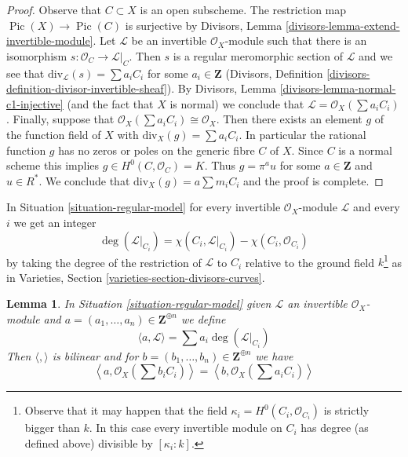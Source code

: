 \documentclass{stacks-project}
\theoremstyle{plain}
\newtheorem{lemma}[subsection]{Lemma}
\theoremstyle{definition}
\theoremstyle{remark}
\numberwithin{equation}{subsection}
\def\Pic{\mathop{\mathrm{Pic}}\nolimits}
\begin{document}
\begin{proof}
Observe that $C \subset X$ is an open subscheme. The restriction
map $\Pic(X) \to \Pic(C)$ is surjective by
Divisors, Lemma \ref{divisors-lemma-extend-invertible-module}.
Let $\mathcal{L}$ be an invertible $\mathcal{O}_X$-module
such that there is an isomorphism $s : \mathcal{O}_C \to \mathcal{L}|_C$.
Then $s$ is a regular meromorphic section of $\mathcal{L}$
and we see that $\text{div}_\mathcal{L}(s) = \sum a_i C_i$
for some $a_i \in \mathbf{Z}$
(Divisors, Definition \ref{divisors-definition-divisor-invertible-sheaf}).
By Divisors, Lemma \ref{divisors-lemma-normal-c1-injective}
(and the fact that $X$ is normal)
we conclude that $\mathcal{L} = \mathcal{O}_X(\sum a_iC_i)$.
Finally, suppose that $\mathcal{O}_X(\sum a_i C_i) \cong \mathcal{O}_X$.
Then there exists an element $g$ of the function field of $X$
with $\text{div}_X(g) = \sum a_i C_i$. In particular the rational
function $g$ has no zeros or poles on the generic fibre $C$ of $X$.
Since $C$ is a normal scheme this implies $g \in H^0(C, \mathcal{O}_C) = K$.
Thus $g = \pi^a u$ for some $a \in \mathbf{Z}$ and $u \in R^*$.
We conclude that $\text{div}_X(g) = a \sum m_i C_i$ and the proof
is complete.
\end{proof}

\noindent
In Situation \ref{situation-regular-model} for every invertible
$\mathcal{O}_X$-module $\mathcal{L}$ and every $i$ we get an integer
$$
\deg(\mathcal{L}|_{C_i}) =
\chi(C_i, \mathcal{L}|_{C_i}) - \chi(C_i, \mathcal{O}_{C_i})
$$
by taking the degree of the restriction of $\mathcal{L}$ to $C_i$
relative to the ground field $k$\footnote{Observe that it may happen
that the field $\kappa_i = H^0(C_i, \mathcal{O}_{C_i})$ is strictly bigger
than $k$. In this case every invertible module on $C_i$ has
degree (as defined above) divisible by $[\kappa_i : k]$.}
as in Varieties, Section \ref{varieties-section-divisors-curves}.

\begin{lemma}
\label{lemma-intersection-pairing}
In Situation \ref{situation-regular-model} given $\mathcal{L}$ an invertible
$\mathcal{O}_X$-module and
$a = (a_1, \ldots, a_n) \in \mathbf{Z}^{\oplus n}$ we define
$$
\langle a, \mathcal{L} \rangle = \sum a_i\deg(\mathcal{L}|_{C_i})
$$
Then $\langle , \rangle$ is bilinear and for
$b = (b_1, \ldots, b_n) \in \mathbf{Z}^{\oplus n}$ we have
$$
\left\langle a, \mathcal{O}_X(\sum b_i C_i) \right\rangle =
\left\langle b, \mathcal{O}_X(\sum a_i C_i) \right\rangle
$$
\end{lemma}
\end{document}
